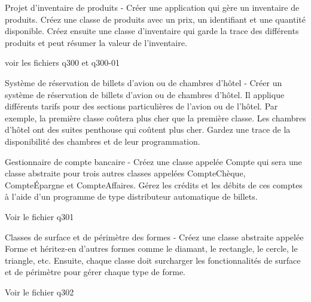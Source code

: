 \renewcommand{\chemincode}{../../code/}
        \question
Projet d'inventaire de produits - Créer une application qui gère un inventaire de produits. Créez une classe de produits avec un prix, un identifiant et une quantité disponible. Créez ensuite une classe d'inventaire qui garde la trace des différents produits et peut résumer la valeur de l'inventaire.
        \par
        
        \begin{solution}
        voir les fichiers q300 et q300-01
            
        \end{solution}

\question
Système de réservation de billets d'avion ou de chambres d'hôtel - Créer un système de réservation de billets d'avion ou de chambres d'hôtel. Il applique différents tarifs pour des sections particulières de l'avion ou de l'hôtel. Par exemple, la première classe coûtera plus cher que la première classe. Les chambres d'hôtel ont des suites penthouse qui coûtent plus cher. Gardez une trace de la disponibilité des chambres et de leur programmation.

\question
Gestionnaire de compte bancaire - Créez une classe appelée Compte qui sera une classe abstraite pour trois autres classes appelées CompteChèque, CompteÉpargne et CompteAffaires. Gérez les crédits et les débits de ces comptes à l'aide d'un programme de type distributeur automatique de billets.

       \begin{solution}
       Voir le fichier q301
        \end{solution}
        
\question
Classes de surface et de périmètre des formes - Créez une classe abstraite appelée Forme et héritez-en d'autres formes comme le diamant, le rectangle, le cercle, le triangle, etc. Ensuite, chaque classe doit surcharger les fonctionnalités de surface et de périmètre pour gérer chaque type de forme.

       \begin{solution}
       		Voir le fichier q302
        \end{solution}
       